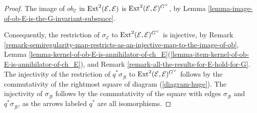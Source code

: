 \documentclass[12pt]{amsart}
\newcommand{\hide}[1]{}
\numberwithin{equation}{subsection}
\theoremstyle{plain}
\theoremstyle{definition}
\newcommand{\B}{{\mathcal B}}
\newcommand{\E}{{\mathcal E}}
\newcommand{\StructureSheaf}[1]{{\mathcal O}_{#1}}
\newcommand{\Ext}{{\rm Ext}}
\newcommand{\Ideal}[1]{{\mathcal I}_{#1}}
\begin{document}
\begin{proof}
The image of $ob_\E$ in $\Ext^2(\E,\E)$ is $\Ext^2(\E,\E)^{G^\vee}$, by Lemma \ref{lemma-image-of-ob-E-is-the-G-invariant-subspace}.
\hide{ 
It suffices to prove that the image of $ob_{\pi_1^*\Ideal{\cup_{i=1}^n C_i}\otimes\pi_2^*\Ideal{\cup_{j=1}^n\Sigma_j}}$ is
$\Ext^2(\pi_1^*\Ideal{\cup_{i=1}^n C_i}\otimes\pi_2^*\Ideal{\cup_{j=1}^n\Sigma_j})^{G_1\times G_2}$.
The latter reduces to showing that (i) the image of $ob_{\Ideal{\cup_{i=1}^n C_i}}$ is equal to 
$\Ext^2(\Ideal{\cup_{i=1}^n C_i},\Ideal{\cup_{i=1}^n C_i})^{G_1}$, (ii) the analogous statement for $ob_{\Ideal{\cup_{i=1}^n \Sigma_j}}$, 
(iii) that 
\[
\exp(at_{\Ideal{\cup_{i=1}^n C_i}}):HT^0(X)\rightarrow \Ext^1(\Ideal{\cup_{i=1}^n C_i},\Ideal{\cup_{i=1}^n C_i})^{G_1}
\] 
is surjective, and (iv) the analogous statement for $\Ideal{\cup_{j=1}^n \Sigma_j}$.
Now the equality of the image of $ob_{\Ideal{\cup_{i=1}^n C_i}}$ with $\Ext^2(\Ideal{\cup_{i=1}^n C_i},\Ideal{\cup_{i=1}^n C_i})^{G_1}$ follows from Lemma \ref{lemma-Yoneda-algebra-is-generated-in-degree-1} and 
Proposition \ref{prop-obstruction-map-has-rank-6}, establishing (i).
These two results also show that the natural map from the direct summand $H^1(\StructureSheaf{X})$ of $HT^1(X)$ into 
$\Ext^1(\Ideal{\cup_{i=1}^n C_i},\Ideal{\cup_{i=1}^n C_i})$ together with the image of $at_{\Ideal{\cup_{i=1}^n C_i}}:H^1(TX)\rightarrow \Ext^1(\Ideal{\cup_{i=1}^n C_i},\Ideal{\cup_{i=1}^n C_i})$ span $\Ext^1(\Ideal{\cup_{i=1}^n C_i},\Ideal{\cup_{i=1}^n C_i})^{G_1}$, establishing (iii). The proofs of (ii) and (iv) are analogous.
}
Consequently, the restriction of $\sigma_\E$ to $\Ext^2(\E,\E)^{G^\vee}$  is injective, by Remark \ref{remark-semiregularity-map-restricts-as-an-injective-map-to-the-image-of-ob}, Lemma \ref{lemma-kernel-of-ob-E-is-annihilator-of-ch_E}(\ref{lemma-item-kernel-of-ob-E-is-annihilator-of-ch_E}), and Remark \ref{remark-all-the-results-for-E-hold-for-G}. The injectivity of the restriction of $q^*\sigma^{}_{\B}$ to $\Ext^2(\E,\E)^{G^\vee}$ follows by the commutativity of the rightmost square of diagram (\ref{diagram-huge}). The injectivity of $\sigma^{}_\B$ follows by the commutativity of the square with edges $\sigma^{}_\B$ and $q^*\sigma^{}_{\B}$, as the arrows labeled $q^*$ are all isomorphisms.
\end{proof}
\end{document}
